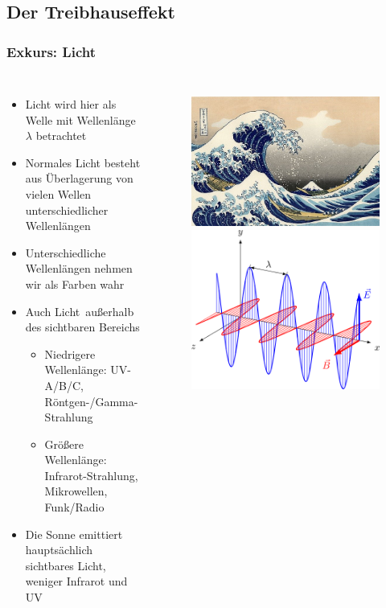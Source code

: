 \subsection{Der Treibhauseffekt}
\begin{frame}
	\frametitle{Exkurs: Licht}
	\begin{columns}
		\begin{itemize}
			\item Licht wird hier als Welle mit Wellenlänge $\lambda$ betrachtet
			\item Normales Licht besteht aus Überlagerung von vielen Wellen unterschiedlicher Wellenlängen
			\item Unterschiedliche Wellenlängen nehmen wir als Farben wahr
			\item Auch \glq Licht\grq\ außerhalb des sichtbaren Bereichs
			\begin{itemize}
				\item Niedrigere Wellenlänge: UV-A/B/C, Röntgen-/Gamma-Strahlung
				\item Größere Wellenlänge: Infrarot-Strahlung, Mikrowellen, Funk/Radio
			\end{itemize}
			\item Die Sonne emittiert hauptsächlich sichtbares Licht, weniger Infrarot und UV
		\end{itemize}
	\begin{figure}
		\centering
		\includegraphics[width=0.5\linewidth]{bilder/welle}
		\includegraphics[width=0.5\linewidth]{bilder/EM-Wave_noGIF}\\

\end{figure}
\end{columns}
\end{frame}
